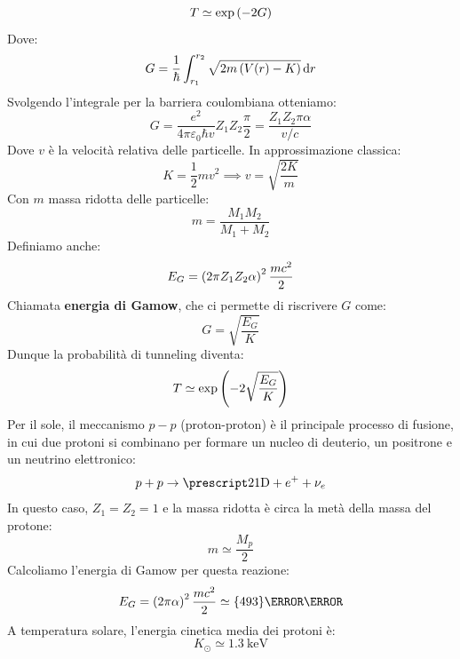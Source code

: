 \begin{equation}
    T \simeq \exp\left(-2 G\right)
\end{equation}
Dove:
\begin{equation}
    G = \dfrac{1}{\hbar} \int_{r_1}^{r_2} \sqrt{2m \left(V(r) - K\right)} \dd{r}
\end{equation}
Svolgendo l'integrale per la barriera coulombiana otteniamo:
\begin{equation}
    G = \dfrac{e^2}{4 \pi \varepsilon_0 \hbar v} Z_1 Z_2 \dfrac{\pi}{2} = \dfrac{Z_1 Z_2 \pi \alpha}{v/c}
\end{equation}
Dove $v$ è la velocità relativa delle particelle. In approssimazione classica:
\begin{equation}
    K = \dfrac{1}{2} m v^2 \implies v = \sqrt{\dfrac{2K}{m}}
\end{equation}
Con $m$ massa ridotta delle particelle:
\begin{equation}
    m = \dfrac{M_1 M_2}{M_1 + M_2}
\end{equation}
Definiamo anche:
\begin{equation}
    E_G = \left(2 \pi Z_1 Z_2 \alpha\right)^2 \dfrac{m c^2}{2}
\end{equation}
Chiamata \textbf{energia di Gamow}, che ci permette di riscrivere $G$ come:
\begin{equation}
    G = \sqrt{\dfrac{E_G}{K}}
\end{equation}
Dunque la probabilità di tunneling diventa:
\begin{equation}
    T \simeq \exp\left(-2 \sqrt{\dfrac{E_G}{K}}\right)
\end{equation}
Per il sole, il meccanismo $p-p$ (proton-proton) è il principale processo di fusione, in cui due protoni si combinano per formare un nucleo di deuterio, un positrone e un neutrino elettronico:
\begin{equation}
    p + p \rightarrow \atom{D}{2}{1} + e^+ + \nu_e
\end{equation}
In questo caso, $Z_1 = Z_2 = 1$ e la massa ridotta è circa la metà della massa del protone:
\begin{equation}
    m \simeq \dfrac{M_p}{2}
\end{equation}
Calcoliamo l'energia di Gamow per questa reazione:
\begin{equation}
    E_G = \brackets{2 \pi \alpha}^2 \dfrac{m c^2}{2} \simeq \qty{493}{\kilo\electronvolt}
\end{equation}
A temperatura solare, l'energia cinetica media dei protoni è:
\begin{equation}
    K_{\odot} \simeq \qty{1.3}{\kilo\electronvolt}
\end{equation}
